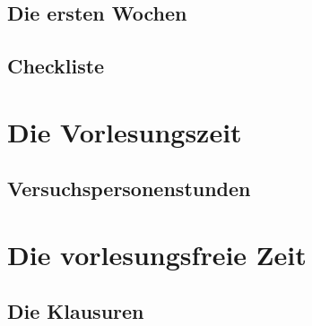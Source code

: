 \documentclass[12pt, a4paper]{article}
\newif\ifinfo
\begin{document}
\else
	





	\subsection{Die ersten Wochen}
	
\fi


\pagebreak

\subsection{Checkliste}



\pagebreak
\section{Die Vorlesungszeit}
\ifinfo
	\subsection{Der Stundenplan}
	
	
\else
	\subsection{Versuchspersonenstunden}
	
\fi

\pagebreak

\section{Die vorlesungsfreie Zeit}
\subsection{Die Klausuren}
\ifinfo
	
\else
	
\fi
\end{document}

